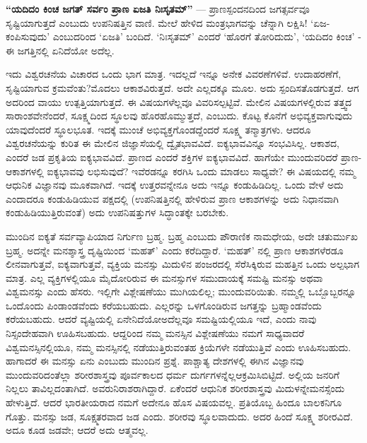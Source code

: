 \textbf{“ಯದಿದಂ ಕಿಂಚ ಜಗತ್​ ಸರ್ವಂ ಪ್ರಾಣ ಏಜತಿ ನಿಃಸೃತಮ್​”} — ಪ್ರಾಣ\-ಸ್ಪಂದನದಿಂದ ಜಗತ್ಸರ್ವವೂ ಸೃಷ್ಟಿಯಾಗುತ್ತದೆ ಎಂಬುದು ಉಪನಿಷತ್ತಿನ ವಾಣಿ. ಮೇಲೆ ಹೇಳಿದ ಮಂತ್ರಭಾಗವನ್ನು ಚೆನ್ನಾಗಿ ಲಕ್ಷಿಸಿ! ‘ಏಜ-ಕಂಪಿಸುವುದು’ ಎಂಬುದರಿಂದ ‘ಏಜತಿ’ ಬಂದಿದೆ. ‘ನಿಃಸೃತಮ್​’ ಎಂದರೆ ‘ಹೊರಗೆ ತೋರಿದುದು’, ‘ಯದಿದಂ ಕಿಂಚ’ - ಈ ಜಗತ್ತಿನಲ್ಲಿ ಏನಿದೆಯೋ ಅದೆಲ್ಲ.

ಇದು ವಿಶ್ವರಚನೆಯ ವಿಚಾರದ ಒಂದು ಭಾಗ ಮಾತ್ರ. ಇದಲ್ಲದೆ ಇನ್ನೂ ಅನೇಕ ವಿವರಣೆಗಳಿವೆ. ಉದಾಹರಣೆಗೆ, ಸೃಷ್ಟಿಯಾಗುವ ಕ್ರಮವೆಂತು?\break ಮೊದಲು ಆಕಾಶವಿರುತ್ತದೆ. ಅದೇ ಎಲ್ಲದಕ್ಕೂ ಮೂಲ. ಅದು ಸ್ಪಂದಿಸ\break ತೊಡಗುತ್ತದೆ. ಆಗ ಅದರಿಂದ ವಾಯು ಉತ್ಪತ್ತಿಯಾಗುತ್ತದೆ. ಈ ವಿಷಯ\-ಗಳೆಲ್ಲವೂ ವಿವರಿಸಲ್ಪಟ್ಟಿವೆ. ಮೇಲಿನ ವಿಷಯಗಳಲ್ಲಿರುವ ತತ್ತ್ವದ ಸಾರಾಂಶ\-ವೇನೆಂದರೆ, ಸೂಕ್ಷ್ಮದಿಂದ ಸ್ಥೂಲವು ಹೊರಹೊಮ್ಮುತ್ತದೆ, ಎಂಬುದು. ಕೊಟ್ಟ ಕೊನೆಗೆ ಅಭಿವ್ಯಕ್ತವಾಗುವುದು ಯಾವುದೆಂದರೆ ಸ್ಥೂಲಭೂತ. ಇದಕ್ಕೆ ಮುಂಚೆ ಅಭಿವ್ಯಕ್ತಗೊಂಡದ್ದೆಂದರೆ ಸೂಕ್ಷ್ಮ ತನ್ಮಾತ್ರಗಳು. ಆದರೂ ವಿಶ್ವರಚನೆಯನ್ನು ಕುರಿತ ಈ ಮೇಲಿನ ಜಿಜ್ಞಾಸೆಯಲ್ಲಿ ದ್ವೈತಭಾವವಿದೆ. ಐಕ್ಯಭಾವವಿನ್ನೂ ಸಂಭವಿಸಿಲ್ಲ. ಆಕಾಶದ, ಎಂದರೆ ಜಡ ಪ್ರಕೃತಿಯ ಐಕ್ಯಭಾವವಿದೆ. ಪ್ರಾಣದ ಎಂದರೆ ಶಕ್ತಿಗಳ ಐಕ್ಯಭಾವವಿದೆ. ಹಾಗೆಯೇ ಮುಂದುವರಿದರೆ ಪ್ರಾಣ-ಆಕಾಶಗಳಲ್ಲಿ ಐಕ್ಯಭಾವವು ಲಭಿಸುವುದೆ? ಇವೆರಡನ್ನೂ ಕರಗಿಸಿ ಒಂದು ಮಾಡಲು ಸಾಧ್ಯವೇ? ಈ ವಿಷಯದಲ್ಲಿ ನಮ್ಮ ಆಧುನಿಕ ವಿಜ್ಞಾನವು ಮೂಕವಾಗಿದೆ. ಇದಕ್ಕೆ ಉತ್ತರವನ್ನೇನೂ ಅದು ಇನ್ನೂ ಕಂಡುಹಿಡಿದಿಲ್ಲ. ಒಂದು ವೇಳೆ ಅದು ಎಂದಾದರೂ ಕಂಡುಹಿಡಿಯುವ ಪಕ್ಷದಲ್ಲಿ (ಉಪನಿಷತ್ತಿನಲ್ಲಿ ಹೇಳಿರುವ ಪ್ರಾಣ ಆಕಾಶಗಳನ್ನು ಅದು ನಿಧಾನವಾಗಿ ಕಂಡುಹಿಡಿಯುತ್ತಿರುವಂತೆ) ಅದು ಉಪನಿಷತ್ತುಗಳ ಸಿದ್ಧಾಂತಕ್ಕೇ ಬರಬೇಕು.

ಮುಂದಿನ ಐಕ್ಯತೆ ಸರ್ವವ್ಯಾಪಿಯಾದ ನಿರ್ಗುಣ ಬ್ರಹ್ಮ. ಬ್ರಹ್ಮ ಎಂಬುದು ಪೌರಾಣಿಕ ನಾಮಧೇಯ, ಅದೇ ಚತುರ್ಮುಖ ಬ್ರಹ್ಮ. ಅದನ್ನೇ ಮನಶ್ಶಾಸ್ತ್ರ ದೃಷ್ಟಿಯಿಂದ ‘ಮಹತ್​’ ಎಂದು ಕರೆದಿದ್ದಾರೆ. ‘ಮಹತ್​’ ನಲ್ಲಿ ಪ್ರಾಣ ಆಕಾಶಗಳೆರಡೂ ಲೀನವಾಗುತ್ತವೆ, ಐಕ್ಯವಾಗುತ್ತವೆ, ವ್ಯಕ್ತಿಯ ಮನಸ್ಸು ಮಿದುಳಿನ ಪಂಜರದಲ್ಲಿ ಸೆರೆಸಿಕ್ಕಿರುವ ಮಹತ್ತಿನ ಒಂದು ಅಲ್ಪಭಾಗ ಮಾತ್ರ. ಎಲ್ಲ ವ್ಯಕ್ತಿಗಳಲ್ಲಿಯೂ ಮೈದೋರಿರುವ ಈ ಮನಸ್ಸುಗಳ ಸಮುದಾಯಕ್ಕೆ ಸಮಷ್ಟಿ ಮನಸ್ಸು ಅಥವಾ ವಿಶ್ವಮನಸ್ಸು ಎಂದು ಹೆಸರು. ಇಲ್ಲಿಗೇ ವಿಶ್ಲೇಷಣೆಯು ಮುಗಿಯ\-ಲಿಲ್ಲ; ಮುಂದುವರಿಯಿತು. ನಮ್ಮಲ್ಲಿ ಒಬ್ಬೊಬ್ಬರನ್ನೂ ಒಂದೊಂದು ಪಿಂಡಾಂಡವೆಂದು ಕರೆಯಬಹುದು. ಎಲ್ಲರನ್ನು ಒಳಗೊಂಡಿರುವ ಜಗತ್ತನ್ನು ಬ್ರಹ್ಮಾಂಡವೆಂದು ಕರೆಯಬಹುದು. ಆದರೆ ವ್ಯಷ್ಟಿಯಲ್ಲಿ ಏನೇನಿದೆಯೋ\break ಅದೆಲ್ಲವೂ ಸಮಷ್ಟಿಯಲ್ಲಿಯೂ ಇದೆ, ಎಂದು ನಾವು ನಿಸ್ಸಂದೇಹವಾಗಿ ಊಹಿಸ\-ಬಹುದು. ಆದ್ದರಿಂದ ನಮ್ಮ ಮನಸ್ಸಿನ ವಿಶ್ಲೇಷಣೆಯು ನಮಗೆ ಸಾಧ್ಯವಾದರೆ ವಿಶ್ವಮನಸ್ಸಿ\-ನಲ್ಲಿಯೂ, ನಮ್ಮ ಮನಸ್ಸಿನಲ್ಲಿ ನಡೆಯುತ್ತಿರುವಂತಹ ಕ್ರಿಯೆಗಳೇ ನಡೆಯುತ್ತಿವೆ ಎಂದು ಊಹಿಸಬಹುದು. ಹಾಗಾದರೆ ಈ ಮನಸ್ಸು ಏನು ಎಂಬುದು ಮುಂದಿನ ಪ್ರಶ್ನೆ. ಪಾಶ್ಚಾತ್ಯ ದೇಶಗಳಲ್ಲಿ ಈಗಿನ ವಿಜ್ಞಾನವು ಮುಂದುವರಿದಂತೆಲ್ಲಾ ಶರೀರಶಾಸ್ತ್ರವು ಪೂರ್ವಕಾಲದ ಧರ್ಮ ದುರ್ಗಗಳನ್ನೆಲ್ಲ\break ಆಕ್ರಮಿಸಿಬಿಟ್ಟಿದೆ. ಅಲ್ಲಿಯ ಜನರಿಗೆ ನಿಲ್ಲಲು ತಾವಿಲ್ಲದಂತಾಗಿದೆ. ಅವರು\break ನಿರಾಶರಾಗಿದ್ದಾರೆ. ಏಕೆಂದರೆ ಆಧುನಿಕ ಶರೀರಶಾಸ್ತ್ರವು ಮಿದುಳನ್ನೇ\break ಮನಸ್ಸೆಂದು ಹೇಳುತ್ತಿದೆ. ಆದರೆ ಭಾರತೀಯರಾದ ನಮಗೆ ಅದೇನೂ ಹೊಸ ವಿಷಯವಲ್ಲ. ಪ್ರತಿಯೊಬ್ಬ ಹಿಂದೂ ಬಾಲಕನಿಗೂ ಗೊತ್ತು. ಮನಸ್ಸು ಜಡ, ಸೂಕ್ಷ್ಮತರವಾದ ಜಡ ಎಂದು. ಶರೀರವು ಸ್ಥೂಲವಾದುದು. ಅದರ ಹಿಂದೆ ಸೂಕ್ಷ್ಮ ಶರೀರವಿದೆ. ಅದೂ ಕೂಡ ಜಡವೇ; ಆದರೆ ಅದು ಆತ್ಮವಲ್ಲ.

